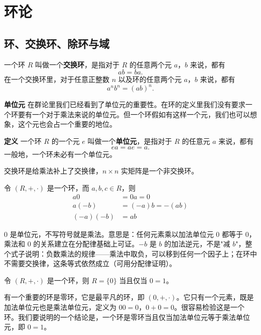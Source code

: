 \chapter{环论}

\section{环、交换环、除环与域}

\begin{definition}[交换环与单位元]
一个环 $R$ 叫做一个\textbf{交换环}，是指对于 $R$ 的任意两个元 $a$，$b$ 来说，都有
\[
ab=ba.
\]
在一个交换环里，对于任意正整数 $n$ 以及环的任意两个元 $a$，$b$ 来说，都有
\[
a^n b^n=(ab)^n.
\]

\textbf{单位元} \quad 在群论里我们已经看到了单位元的重要性。在环的定义里我们没有要求一个环要有一个对于乘法来说的单位元。但一个环假如有这样一个元，我们也可以想象，这个元也会占一个重要的地位。

\textbf{定义} \quad 一个环 $R$ 的一个元 $e$ 叫做一个\textbf{单位元}，是指对于 $R$ 的任意元 $a$ 来说，都有
\[
ea=ae=a.
\]
一般地，一个环未必有一个单位元。
\end{definition}

\begin{note}
交换环是给乘法补上了交换律，$n\times n$ 实矩阵是一个非交换环。
\end{note}

\begin{proposition}[命题 2.1：负元、$0$ 元的运算]
令 $(R,+,\cdot)$ 是一个环，而 $a,b,c\in R$，则
\begin{align}
a0&=0a=0\\
a(-b)&=(-a)b=-(ab)\\
(-a)(-b)&=ab
\end{align}

$0$ 是单位元，不写符号就是乘法。意思是：任何元素乘以加法单位元 $0$ 都等于 $0$，乘法和 $0$ 的关系建立在分配律基础上可证。$-b$ 是 $b$ 的加法逆元，不是"减 $b$"，整个式子说明：负数乘法的规律——乘法中取负，可以移到任何一个因子上；在环中不需要交换律，这条等式依然成立（可用分配律证明）。
\end{proposition}

\begin{proposition}[命题 2.2：零环，加法单位元与乘法单位元相等]
令 $(R,+,\cdot)$ 是一个环，则 $R=\{0\}$ 当且仅当 $0=1$。

有一个重要的环是零环，它是最平凡的环，即 $(0,+,\cdot)$。它只有一个元素，既是加法单位元也是乘法单位元，定义为 $00=0$，$0+0=0$。很容易检验这是一个环。我们要说明的一个结论是，一个环是零环当且仅当加法单位元等于乘法单位元，即 $0=1$。
\end{proposition}

